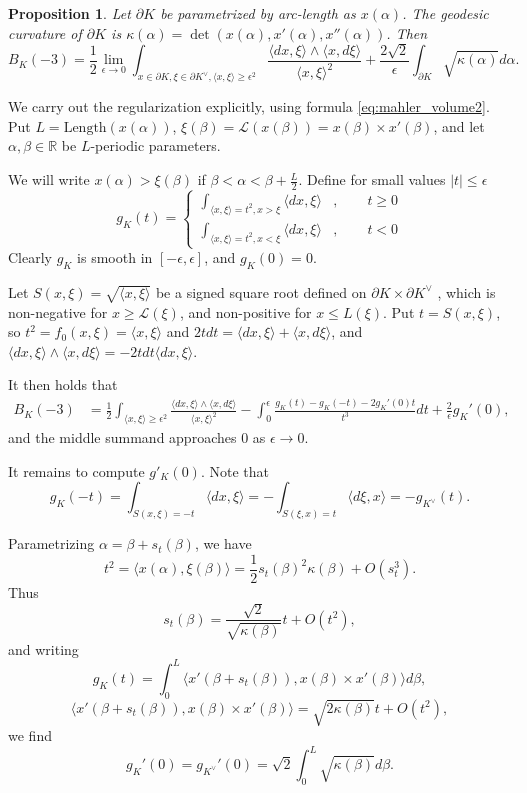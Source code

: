 \documentclass[reqno,10pt]{amsart}
\newcounter{mp}
\newtheorem{Proposition}{Proposition}[section]
\newcommand{\R}{\mathbb{R}}
\begin{document}
\begin{Proposition}
	Let $\partial K$ be parametrized by arc-length as $x(\alpha)$. The geodesic curvature of $\partial K$ is $\kappa(\alpha)=\det (x(\alpha), x'(\alpha), x''(\alpha))$. Then
	$$B_K(-3)= \frac12 \lim_{\epsilon\to 0}\int_{x\in\partial K, \xi\in \partial K^\vee, \langle x,\xi\rangle \geq\epsilon^2}\frac{\langle dx,\xi\rangle\wedge\langle x,d\xi\rangle}{\langle x,\xi\rangle^2}+\frac{2\sqrt 2}{\epsilon}\int_{\partial K}\sqrt {\kappa(\alpha )}d\alpha.$$
\end{Proposition}
\proof
We carry out the regularization explicitly, using formula \eqref{eq:mahler_volume2}. Put $L=\textrm{Length}(x(\alpha))$, $\xi(\beta)=\mathcal L(x(\beta))=x(\beta)\times x'(\beta)$, and let $\alpha,\beta\in\R$ be $L$-periodic parameters.

We will write $x(\alpha)>\xi(\beta)$ if $\beta<\alpha<\beta+\frac{L}{2}$. Define for small values $|t|\leq \epsilon$
\[g_K(t)=\left\{\begin{array}{cc}\int_{\langle x,\xi\rangle =t^2, x>\xi}\langle dx,\xi\rangle&,\qquad t\geq0 \\ \int_{\langle x,\xi\rangle =t^2, x<\xi}\langle dx,\xi\rangle&,\qquad t<0 \end{array}\right.\]
Clearly $g_K$ is smooth in $[-\epsilon,\epsilon]$, and $g_K(0)=0$. 


Let $S(x,\xi)=\sqrt{\langle x,\xi\rangle}$ be a signed square root defined on $\partial K\times \partial K^\vee$ , which is non-negative for $x\geq \mathcal L(\xi)$, and non-positive for $x\leq L(\xi)$. Put $t=S(x,\xi)$, so $t^2=f_0(x,\xi)=\langle x,\xi\rangle$ and $2tdt=\langle dx,\xi\rangle +\langle x,d\xi\rangle$, and $\langle dx,\xi\rangle \wedge\langle x,d\xi\rangle=-2tdt\langle dx,\xi\rangle$.

It then holds that
\begin{align*}B_K(-3)&= \frac12 \int_{\langle x,\xi\rangle \geq\epsilon^2}\frac{\langle dx,\xi\rangle\wedge\langle x,d\xi\rangle}{\langle x,\xi\rangle^2} -  \int_0^{\epsilon}\frac{g_K(t)-g_K(-t)-2g_K'(0)t}{t^3}dt +\frac{2}{\epsilon}g_K'(0) ,
 \end{align*}
and the middle summand approaches $0$ as $\epsilon\to 0$.

It remains to compute $g'_K(0)$. Note that \[g_K(-t)= \int_{S(x,\xi)=-t}\langle dx,\xi \rangle =- \int_{S(\xi,x)=t}\langle d\xi,x\rangle =-g_{K^\vee}(t).\]

Parametrizing $\alpha=\beta+s_t(\beta)$, we have
\[t^2=\langle x(\alpha), \xi(\beta)\rangle =\frac12 s_t(\beta)^2\kappa(\beta)+O(s_t^3).\]
Thus \[s_t(\beta)=\frac{\sqrt2}{\sqrt{\kappa(\beta)}}t+ O(t^2),\] and writing  
\[g_K(t)= \int_0^L \langle x'(\beta +s_t(\beta)),x(\beta)\times x'(\beta)\rangle d\beta,\]
\[\langle x'(\beta +s_t(\beta)),x(\beta)\times x'(\beta)\rangle= \sqrt{2\kappa(\beta)}t+O(t^2),   \]
we find
\[g_K'(0)=g_{K^\vee}'(0)= \sqrt 2\int_0^L\sqrt{\kappa(\beta)}d\beta. \]
\endproof



\end{document}
